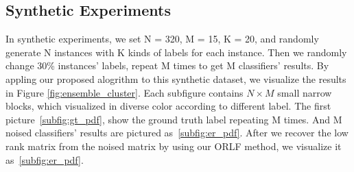 \documentclass[letterpaper]{article}
\begin{document}
\subsection{Synthetic Experiments}


In synthetic experiments, we set N = 320, M = 15, K = 20, and randomly generate N instances with K kinds of labels for each instance. Then we randomly change 30\% instances' labels, repeat M times to get M classifiers' results. By appling our proposed alogrithm to this synthetic dataset, we visualize the results in Figure \ref{fig:ensemble_cluster}. Each subfigure contains $N\times M$ small narrow blocks, which visualized in diverse color according to different label. The first picture~\ref{subfig:gt_pdf}, show the ground truth label repeating M times. And M noised classifiers' results are pictured as~\ref{subfig:er_pdf}. After we recover the low rank matrix from the noised matrix by using our ORLF method, we visualize it as~\ref{subfig:er_pdf}.
\end{document}
